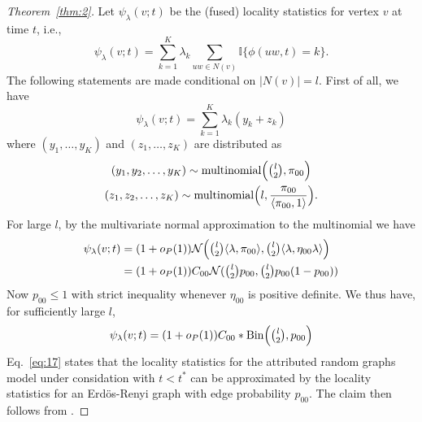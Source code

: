 \documentclass[draftcls]{IEEEtran}
\theoremstyle{definition}
\begin{document}
\begin{proof}[Theorem~\ref{thm:2}]
Let $\psi_{\lambda}(v;t)$ be the (fused) locality statistics for
vertex $v$ at time $t$, i.e.,
\begin{equation}
  \label{eq:11}
  \psi_{\lambda}(v;t) = \sum_{k=1}^{K} \lambda_k \sum_{uw \in N(v)}
  \mathbb{I}\{\phi(uw,t) = k\}.
\end{equation}
The following statements are made conditional on $|N(v)| = l$. First
of all, we have
\begin{equation*}
  \psi_{\lambda}(v;t) = \sum_{k=1}^{K}{\lambda_k (y_k + z_k)}
\end{equation*}
where $(y_1, \dots, y_K)$ and $(z_1, \dots, z_K)$ are distributed as
\begin{gather*}
  (y_1,y_2,\dots,y_K) \sim \textrm{multinomial}\Bigl(
  \tbinom{l}{2}, \pi_{00}\Bigr) \\ (z_1, z_2, \dots, z_K) \sim
  \textrm{multinomial}\Bigl(l, \frac{\pi_{00}}{\langle \pi_{00},
    1\rangle}\Bigr). 
\end{gather*}
For large $l$, by the multivariate normal
approximation to the multinomial we have
\begin{equation*}
  \begin{split}
  \psi_\lambda(v;t) & = (1 + o_{P}(1)) \mathcal{N}\Bigl(\tbinom{l}{2} \langle \lambda, \pi_{00} \rangle,
  \tbinom{l}{2} \langle \lambda, \eta_{00} \lambda \rangle \Bigr) \\ 
  &= (1 + o_{P}(1)) C_{00} \mathcal{N}(\tbinom{l}{2} p_{00}, \tbinom{l}{2} p_{00}
  (1 - p_{00}))
  \end{split}
\end{equation*} 
Now $p_{00} \leq 1$ with strict inequality whenever $\eta_{00}$ is
positive definite. We thus have, for sufficiently large $l$,
\begin{equation}
  \label{eq:17}
 \psi_\lambda(v;t) = (1 + o_P(1)) C_{00} *  
 \mathrm{Bin}\Bigl(\tbinom{l}{2}, p_{00}\Bigr)
\end{equation} 
Eq.~\eqref{eq:17} states that the locality statistics for the
attributed random graphs model under considation with $t < t^{*}$ can
be approximated by the locality statistics for an Erd\"{o}s-Renyi
graph with edge probability $p_{00}$. The claim then follows from
\cite[Theorem 1.1]{rukhin:_limit_distr_graph_scan_statis}.
\end{proof}

\end{document}
